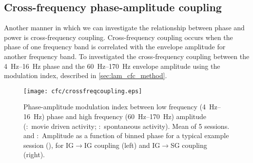 

\subsection{Cross-frequency phase-amplitude coupling}
\label{sec:lam_cfc}

Another manner in which we can investigate the relationship between phase and power is cross-frequency coupling.
Cross-frequency coupling occurs when the phase of one frequency band is correlated with the envelope amplitude for another frequency band.
To investigated the cross-frequency coupling between the \SIrange{4}{16}{Hz} phase and the \SIrange{60}{170}{Hz} envelope amplitude using the modulation index, described in \autoref{sec:lam_cfc_method}.

\begin{figure}[htbp]
\subfloat{\label{fig:lam_cfc_movie}}
\subfloat{\label{fig:lam_cfc_spont}}
\subfloat{\label{fig:lam_cfc_movie_traces}}
\subfloat{\label{fig:lam_cfc_spont_traces}}
\centering \texttt{[image: cfc/crossfreqcoupling.eps]}
%
\caption{
Phase-amplitude modulation index between low frequency (\SIrange{4}{16}{Hz}) phase and high frequency (\SIrange{60}{170}{Hz}) amplitude (\protect{}:~movie driven activity; \protect{}:~spontaneous activity).
Mean of \num{5} sessions.
\protect{} and \protect{}:~Amplitude as a function of binned phase for a typical example session (), for \ac{IG}$\rightarrow$\ac{IG} coupling (left) and \ac{IG}$\rightarrow$\ac{SG} coupling (right).}%
\label{fig:lam_8}
%
\end{figure}

